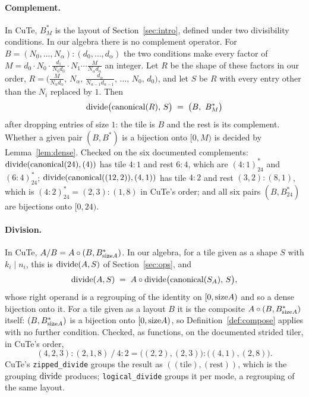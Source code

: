 \paragraph{Complement.} In CuTe, $B^{*}_{M}$ is the layout of
Section~\ref{sec:intro}, defined under two divisibility conditions. In our
algebra there is no complement operator. For
$B = (N_0,\dots,N_\alpha){:}(d_0,\dots,d_\alpha)$ the two conditions make
every factor of
$M = d_0 \cdot N_0 \cdot \tfrac{d_1}{N_0 d_0} \cdot N_1 \cdots
\tfrac{M}{N_\alpha d_\alpha}$ an integer. Let $R$ be the shape of these
factors in our order,
$R = \big(\tfrac{M}{N_\alpha d_\alpha},\, N_\alpha,\,
\tfrac{d_\alpha}{N_{\alpha-1}d_{\alpha-1}},\, \dots,\, N_0,\, d_0\big)$,
and let $S$ be $R$ with every entry other than the $N_i$ replaced by $1$.
Then
\[
\mathrm{divide}\big(\mathrm{canonical}(R),\, S\big) \;=\; \big(B,\ B^{*}_{M}\big)
\]
after dropping entries of size $1$: the tile is $B$ and the rest is its
complement. Whether a given pair $(B, B^{*})$ is a bijection onto $[0,M)$ is
decided by Lemma~\ref{lem:dense}. Checked on the six documented complements:
$\mathrm{divide}(\mathrm{canonical}(24), (4))$ has tile $4{:}1$ and rest $6{:}4$,
which are $(4{:}1)^{*}_{24}$ and $(6{:}4)^{*}_{24}$;
$\mathrm{divide}(\mathrm{canonical}((12,2)), (4,1))$ has tile $4{:}2$ and rest
$(3,2){:}(8,1)$, which is $(4{:}2)^{*}_{24} = (2,3){:}(1,8)$ in CuTe's
order; and all six
pairs $(B, B^{*}_{24})$ are bijections onto $[0,24)$.

\paragraph{Division.} In CuTe, $A / B = A \circ (B, B^{*}_{\mathrm{size} A})$. In our
algebra, for a tile given as a shape $S$ with $k_i \mid n_i$, this is $\mathrm{divide}(A,S)$ of
Section~\ref{sec:ops}, and
\[
\mathrm{divide}(A, S) \;=\; A \circ \mathrm{divide}\big(\mathrm{canonical}(S_A),\, S\big),
\]
whose right operand is a regrouping of the identity on $[0,\mathrm{size} A)$ and so a
dense bijection onto it. For a tile given as a layout $B$ it is the composite
$A \circ (B, B^{*}_{\mathrm{size} A})$ itself: $(B, B^{*}_{\mathrm{size} A})$ is a bijection
onto $[0,\mathrm{size} A)$, so Definition~\ref{def:compose} applies with no further
condition. Checked, as functions, on the documented strided tiler, in
CuTe's order,
\[
(4,2,3){:}(2,1,8) \mathbin{/} 4{:}2 =
\big((2,2),(2,3)\big){:}\big((4,1),(2,8)\big).
\]
CuTe's
\texttt{zipped\_divide} groups the result as $((\text{tile}),(\text{rest}))$,
which is the grouping $\mathrm{divide}$ produces; \texttt{logical\_divide} groups
it per mode, a regrouping of the same layout.

